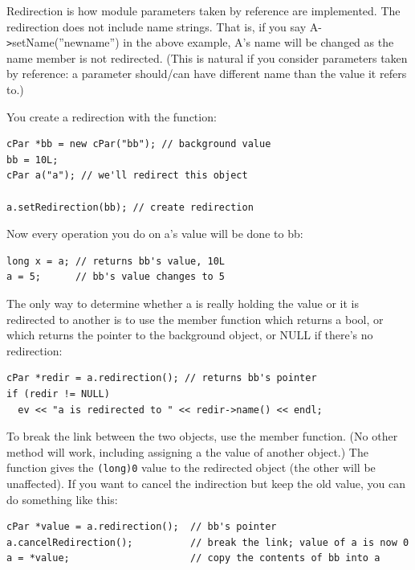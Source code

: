 Redirection is how module parameters taken by
reference are implemented.  The
redirection does not include name strings. That is, if you say
A-\texttt{>}setName(''newname'') in the above example, A's name will
be changed as the name member is not redirected. (This is natural if
you consider parameters taken by reference: a parameter should/can
have different name than the value it refers to.)


You create a redirection with the  function:

\begin{Verbatim}
cPar *bb = new cPar("bb"); // background value
bb = 10L;
cPar a("a"); // we'll redirect this object

a.setRedirection(bb); // create redirection
\end{Verbatim}


Now every operation you do on a's value will be done to bb:

\begin{Verbatim}
long x = a; // returns bb's value, 10L
a = 5;      // bb's value changes to 5
\end{Verbatim}


The only way to determine whether a is really holding the value or it
is redirected to another  is to use the
 member function which returns a bool, or
 which returns the pointer to the background
object, or NULL if there's no redirection:

\begin{Verbatim}
cPar *redir = a.redirection(); // returns bb's pointer
if (redir != NULL)
  ev << "a is redirected to " << redir->name() << endl;
\end{Verbatim}


To break the link between the two objects, use the
 member function. (No other method will
work, including assigning a the value of another 
object.) The  function gives the \texttt{(long)0}
value to the redirected object (the other will be unaffected). If you
want to cancel the indirection but keep the old value, you can do
something like this:

\begin{Verbatim}
cPar *value = a.redirection();  // bb's pointer
a.cancelRedirection();          // break the link; value of a is now 0
a = *value;                     // copy the contents of bb into a
\end{Verbatim}






